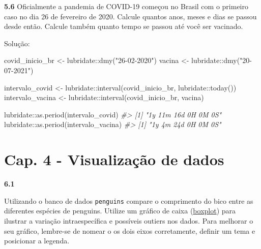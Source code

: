 \documentclass[
]{book}
\newenvironment{Shaded}{\begin{snugshade}}{\end{snugshade}}
\newcommand{\CommentTok}[1]{\textcolor[rgb]{0.56,0.35,0.01}{\textit{#1}}}
\newcommand{\FunctionTok}[1]{\textcolor[rgb]{0.00,0.00,0.00}{#1}}
\newcommand{\NormalTok}[1]{#1}
\newcommand{\OtherTok}[1]{\textcolor[rgb]{0.56,0.35,0.01}{#1}}
\newcommand{\SpecialCharTok}[1]{\textcolor[rgb]{0.00,0.00,0.00}{#1}}
\newcommand{\StringTok}[1]{\textcolor[rgb]{0.31,0.60,0.02}{#1}}
\begin{document}
\textbf{5.6}
Oficialmente a pandemia de COVID-19 começou no Brasil com o primeiro caso no dia 26 de fevereiro de 2020. Calcule quantos anos, meses e dias se passou desde então. Calcule também quanto tempo se passou até você ser vacinado.

Solução:

\begin{Shaded}
\begin{Highlighting}[]
\NormalTok{covid\_inicio\_br }\OtherTok{\textless{}{-}}\NormalTok{ lubridate}\SpecialCharTok{::}\FunctionTok{dmy}\NormalTok{(}\StringTok{"26{-}02{-}2020"}\NormalTok{)}
\NormalTok{vacina }\OtherTok{\textless{}{-}}\NormalTok{ lubridate}\SpecialCharTok{::}\FunctionTok{dmy}\NormalTok{(}\StringTok{"20{-}07{-}2021"}\NormalTok{)}

\NormalTok{intervalo\_covid }\OtherTok{\textless{}{-}}\NormalTok{ lubridate}\SpecialCharTok{::}\FunctionTok{interval}\NormalTok{(covid\_inicio\_br, lubridate}\SpecialCharTok{::}\FunctionTok{today}\NormalTok{())}
\NormalTok{intervalo\_vacina }\OtherTok{\textless{}{-}}\NormalTok{ lubridate}\SpecialCharTok{::}\FunctionTok{interval}\NormalTok{(covid\_inicio\_br, vacina)}

\NormalTok{lubridate}\SpecialCharTok{::}\FunctionTok{as.period}\NormalTok{(intervalo\_covid)}
\CommentTok{\#\textgreater{} [1] "1y 11m 16d 0H 0M 0S"}
\NormalTok{lubridate}\SpecialCharTok{::}\FunctionTok{as.period}\NormalTok{(intervalo\_vacina)}
\CommentTok{\#\textgreater{} [1] "1y 4m 24d 0H 0M 0S"}
\end{Highlighting}
\end{Shaded}

\hypertarget{cap.-4---visualizauxe7uxe3o-de-dados}{%
\chapter*{Cap. 4 - Visualização de dados}\label{cap.-4---visualizauxe7uxe3o-de-dados}}

\textbf{6.1}

Utilizando o banco de dados \texttt{penguins} compare o comprimento do bico entre as diferentes espécies de penguins. Utilize um gráfico de caixa (\href{https://analises-ecologicas.netlify.app/cap6.html\#gr\%C3\%A1fico-de-caixa-boxplot}{boxplot}) para ilustrar a variação intraespecífica e possíveis outiers nos dados. Para melhorar o seu gráfico, lembre-se de nomear o os dois eixos corretamente, definir um tema e posicionar a legenda.
\end{document}
